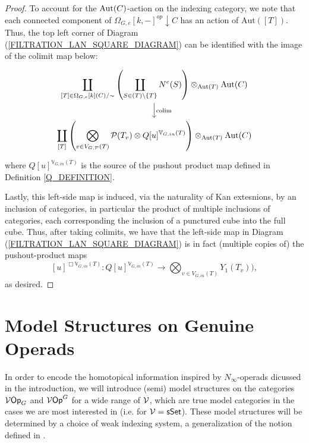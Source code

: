 \documentclass[a4paper,10pt]{article}%
\begin{document}
\begin{proof}
To account for the $\operatorname{Aut}(C)$-action on the indexing category, we note that each connected component of $\Omega_{G,e}[k,-]^{op}\downarrow C$ has an action of $\mathrm{Aut}([T])$. Thus, the top left corner of Diagram (\ref{FILTRATION_LAN_SQUARE_DIAGRAM}) can be identified with the image of the colimit map below:
\[
\begin{tikzcd}
\displaystyle\coprod_{[T]\in \Omega_{G,e}[k](C)/\sim}\left(\displaystyle\coprod_{S\in (T)\setminus{\set{T}}}N^e(S)\right) \otimes_{\mathrm{Aut}(T)}\Aut(C) \arrow[d, "\colim"]\\
\displaystyle\coprod_{[T]}\left( \bigotimes_{v\in V_{G,\P}(T)} \P(T_v) \otimes Q[u]^{\mathbb V_{G,in}(T)}\right) \otimes_{\mathrm{Aut}(T)}\Aut(C)
\end{tikzcd}
\]
where $Q[u]^{\mathbb V_{G,in}(T)}$ is the source of the pushout product map defined in Definition \ref{Q_DEFINITION}.

Lastly, this left-side map is induced, via the naturality of Kan extesnions, by an inclusion of categories, in particular the product of multiple inclusions of categories, each corresponding the inclusion of a punctured cube into the full cube. Thus, after taking colimits, we have that the left-side map in Diagram (\ref{FILTRATION_LAN_SQUARE_DIAGRAM}) is in fact (multiple copies of) the pushout-product maps 
\[
[u]^{\Box \mathbb V_{G,in}(T)}: Q[u]^{\mathbb V_{G,in}(T)} \to \bigotimes_{v\in V_{G,in}(T)}Y_1(T_v)),
\]
as desired.
\end{proof}





\newpage

\section{Model Structures on Genuine Operads}
\renewcommand{\F}{\ensuremath{\mathcal F}}


In order to encode the homotopical information inspired by $N_\infty$-operads dicussed in the introduction, we will introduce (semi) model structures on the categories $\mathcal V\mathsf{Op}_G$ and $\mathcal V\mathsf{Op}^G$ for a wide range of $\mathcal V$, which are true model categories in the cases we are most interested in (i.e. for $\mathcal V = \mathsf{sSet}$).  These model structures will be determined by a choice of weak indexing system, a generalization of the notion defined in \cite{BH15}. 
\end{document}

